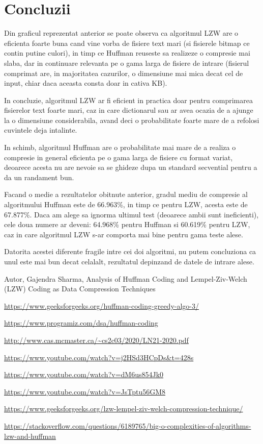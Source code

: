 \documentclass[runningheads]{llncs}
\begin{document}
\section{Concluzii}

Din graficul reprezentat anterior se poate observa ca algoritmul LZW are o eficienta foarte buna cand vine vorba de fisiere text mari (si fisierele
bitmap ce contin putine culori), in timp ce Huffman reuseste sa realizeze o compresie mai slaba, dar in continuare relevanta pe o gama larga de fisiere de intrare
(fisierul comprimat are, in majoritatea cazurilor, o dimensiune mai mica decat cel de input, chiar daca aceasta consta doar in cativa KB).

In concluzie, algoritmul LZW ar fi eficient in practica doar pentru comprimarea fisierelor text foarte mari, caz in care dictionarul sau
ar avea ocazia de a ajunge la o dimensiune considerabila, avand deci o probabilitate foarte mare de a refolosi cuvintele deja intalinte.

In schimb, algoritmul Huffman are o probabilitate mai mare de a realiza o compresie in general eficienta pe o gama larga de fisiere cu format variat, deoarece acesta
nu are nevoie sa se ghideze dupa un standard secvential pentru a da un randament bun.

Facand o medie a rezultatelor obitnute anterior, gradul mediu de compresie al algoritmului Huffman este de 66.963\%, in timp ce pentru LZW, acesta este de 67.877\%.
Daca am alege sa ignorma ultimul test (deoarece ambii sunt ineficienti), cele doua numere ar deveni: 64.968\% pentru Huffman si 60.619\% pentru LZW, caz in care algoritmul
LZW s-ar comporta mai bine pentru gama teste alese.

Datorita acestei diferente fragile intre cei doi algoritmi, nu putem concluziona ca unul este mai bun decat celalalt, rezultatul depinzand
de datele de intrare alese.



\begin{thebibliography}{8}
Autor, Gajendra Sharma, Analysis of Huffman Coding and Lempel-Ziv-Welch (LZW) Coding as
Data Compression Techniques\textbf{}

\url{https://www.geeksforgeeks.org/huffman-coding-greedy-algo-3/}

\url{https://www.programiz.com/dsa/huffman-coding}

\url{http://www.cas.mcmaster.ca/~cs2c03/2020/LN21-2020.pdf}

\url{https://www.youtube.com/watch?v=j2HSd3HCpDs\&t=428s}

\url{https://www.youtube.com/watch?v=dM6us854Jk0}

\url{https://www.youtube.com/watch?v=JsTptu56GM8}

\url{https://www.geeksforgeeks.org/lzw-lempel-ziv-welch-compression-technique/}

\url{https://stackoverflow.com/questions/6189765/big-o-complexities-of-algorithms-lzw-and-huffman}
\end{thebibliography}
\end{document}
